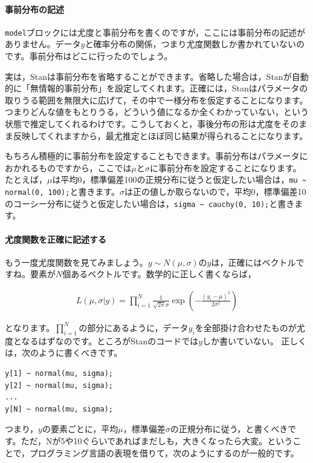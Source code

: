 \documentclass{ltjbook}
\begin{document}
\paragraph{事前分布の記述}
\verb|model|ブロックには尤度と事前分布を書くのですが，ここには事前分布の記述がありません。データ$y$と確率分布の関係，つまり尤度関数しか書かれていないのです。事前分布はどこに行ったのでしょう。

実は，Stanは事前分布を省略することができます。省略した場合は，Stanが自動的に「無情報的事前分布」を設定してくれます。正確には，Stanはパラメータの取りうる範囲を無限大に広げて，その中で一様分布を仮定することになります。つまりどんな値をもとりうる，どういう値になるか全くわかっていない，という状態で推定してくれるわけです。こうしておくと，事後分布の形は尤度をそのまま反映してくれますから，最尤推定とほぼ同じ結果が得られることになります。

もちろん積極的に事前分布を設定することもできます。事前分布はパラメータにおかれるものですから，ここでは$\mu$と$\sigma$に事前分布を設定することになります。たとえば，$\mu$は平均0，標準偏差100の正規分布に従うと仮定したい場合は，\verb|mu ~ normal(0, 100);|と書きます。$\sigma$は正の値しか取らないので，平均0，標準偏差10のコーシー分布に従うと仮定したい場合は，\verb|sigma ~ cauchy(0, 10);|と書きます。

\paragraph{尤度関数を正確に記述する}
もう一度尤度関数を見てみましょう。$y \sim N(\mu,\sigma)$の$y$は，正確にはベクトルですね。要素が$N$個あるベクトルです。数学的に正しく書くならば，

\begin{align}
L(\mu,\sigma|y) = \prod_{i=1}^{N} \frac{1}{\sqrt{2\pi}\sigma} \exp\left(-\frac{(y_i - \mu)^2}{2\sigma^2}\right)
\end{align}

となります。$\prod_{i=1}^{N}$の部分にあるように，データ$y_i$を全部掛け合わせたものが尤度となるはずなのです。ところがStanのコードでは$y$しか書いていない。
正しくは，次のように書くべきです。
\begin{verbatim}
y[1] ~ normal(mu, sigma);
y[2] ~ normal(mu, sigma);
...
y[N] ~ normal(mu, sigma);
\end{verbatim}

つまり，$y$の要素ごとに，平均$\mu$，標準偏差$\sigma$の正規分布に従う，と書くべきです。ただ，Nが5や10ぐらいであればまだしも，大きくなったら大変。ということで，プログラミング言語の表現を借りて，次のようにするのが一般的です。
\end{document}
